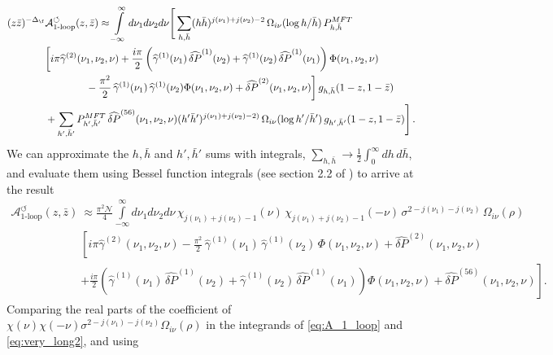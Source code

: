 \begin{align}
(z\bar{z})^{-\Delta_{\f}}& \mathcal{A}_{\text{1-loop}}^{\circlearrowleft}(z,\bar{z}) \approx \int\limits_{-\infty}^{\infty} d\nu_{1}d\nu_2d\nu \Bigg[\sum_{h,\bar{h}}  (h\bar{h})^{j(\nu_1) +j(\nu_2) -2}\,\Omega_{i\nu}(\log h/\bar{h})\, P^{MFT}_{h,\bar{h}}  
\label{eq:very_long}    \\
		& \bigg[i\pi \widehat{\gamma}^{(2)}(\nu_1,\nu_2,\nu)  + \frac{i\pi}{2}\left(\widehat{\gamma}^{(1)}(\nu_1)\,\widehat{\delta P}^{(1)}(\nu_2) + \widehat{\gamma}^{(1)}(\nu_2)\,\widehat{\delta P}^{(1)}(\nu_1)\right)\Phi(\nu_1,\nu_2,\nu)   \nonumber\\
		&  \qquad  \qquad -\frac{\pi^2}{2}\,\widehat{\gamma}^{(1)}(\nu_1)\,\widehat{\gamma}^{(1)}(\nu_2)\Phi(\nu_1,\nu_2,\nu) + \widehat{\delta P}^{(2)}(\nu_1,\nu_2,\nu)   \bigg]\, g_{h,\bar{h}}(1-z,1-\bar{z}) \nonumber \\
		&  + \sum_{h',\bar{h}'} P^{MFT}_{h',\bar{h}'} \,\widehat{\delta P}^{(56)}(\nu_1,\nu_2,\nu) (h'\bar{h}')^{j(\nu_1) +j(\nu_2) -2)}\,\Omega_{i\nu}(\log h'/\bar{h}') \,g_{h',\bar{h}'}(1-z,1-\bar{z}) \Bigg]\,.
		 \nonumber
\end{align}
We can approximate the $h,\bar{h}$ and $h',\bar{h}'$ sums with integrals, $\sum_{h,\bar{h}} \rightarrow \frac{1}{2}\int_{0}^{\infty}dh\, d\bar{h}$, and evaluate them using Bessel function integrals (see section 2.2 of \cite{Meltzer:2019pyl}) to arrive at the result
\begin{align}
\mathcal{A}_{\text{1-loop}}^{\circlearrowleft}(z,\bar{z})&\approx \frac{\pi^2 \mathcal{N}}{4}\int\limits_{-\infty}^{\infty} d\nu_{1}d\nu_2d\nu \, \chi_{j(\nu_1)+j(\nu_2)-1}(\nu)\,\chi_{j(\nu_1)+j(\nu_2)-1}(-\nu) \,
 			\sigma^{2-j(\nu_1)-j(\nu_2)} \,\Omega_{i\nu}(\rho) \nonumber  \\
		& \left[ i\pi \widehat{\gamma}^{(2)}(\nu_1,\nu_2,\nu)  -\frac{\pi^2}{2}\,\widehat{\gamma}^{(1)}(\nu_1)\,\widehat{\gamma}^{(1)}(\nu_2)\,\Phi(\nu_1,\nu_2,\nu) + \widehat{\delta P}^{(2)}(\nu_1,\nu_2,\nu) \right.  
\label{eq:very_long2}  \\
		&  \left. + \frac{i\pi}{2}\left(\widehat{\gamma}^{(1)}(\nu_1)\,\widehat{\delta P}^{(1)}(\nu_2) + \widehat{\gamma}^{(1)}(\nu_2)\,\widehat{\delta P}^{(1)}(\nu_1)\right)\Phi(\nu_1,\nu_2,\nu) + \widehat{\delta P}^{(56)}(\nu_1,\nu_2,\nu) \right] .
\nonumber
\end{align}
Comparing the real parts of the coefficient of $\chi(\nu)\chi(-\nu)\sigma^{2-j(\nu_1)-j(\nu_2)} \Omega_{i\nu}(\rho)$ in the integrands of \eqref{eq:A_1_loop} and \eqref{eq:very_long2}, and using
